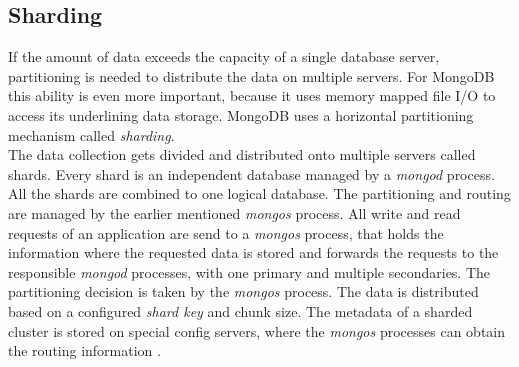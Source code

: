 \subsection{Sharding}
If the amount of data exceeds the capacity of a single database server, partitioning is needed to distribute the data on multiple servers. For MongoDB this ability is even more important, because it uses memory mapped file I/O to access its underlining data storage\cite{Hows2013}. MongoDB uses a horizontal partitioning mechanism called \textit{sharding}.\\
The data collection gets divided and distributed onto multiple servers called shards. Every shard is an independent database managed by a \textit{mongod} process. All the shards are combined to one logical database. The partitioning and routing are managed by the earlier mentioned \textit{mongos} process. All write and read requests of an application are send to a \textit{mongos} process, that holds the information where the requested data is stored and forwards the requests to the responsible \textit{mongod} processes, with one primary and multiple secondaries. The partitioning decision is taken by the \textit{mongos} process. The data is distributed based on a configured \textit{shard key} and chunk size. The metadata of a sharded cluster is stored on special config servers, where the \textit{mongos} processes can obtain the routing information \cite{Edward2015,Hows2013}.

